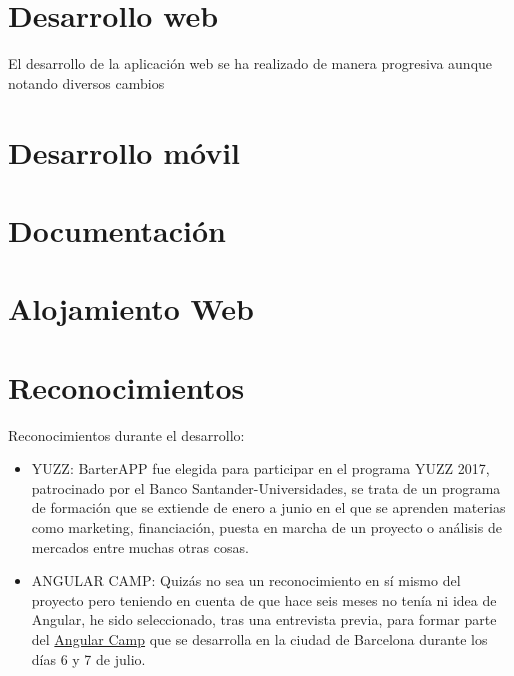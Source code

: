    
   \section{Desarrollo web}\label{dweb}
   
   El desarrollo de la aplicación web se ha realizado de manera progresiva aunque notando diversos cambios 
   
   \section{Desarrollo móvil}\label{dapp}
   
   \section{Documentación}\label{docs}
   
   \section{Alojamiento Web}\label{alojamiento}
   
   \section{Reconocimientos}\label{reconocimientos}
   
   Reconocimientos durante el desarrollo:
   
   \begin{itemize}
	\item YUZZ: BarterAPP fue elegida para participar en el programa YUZZ 2017, patrocinado por el Banco Santander-Universidades, se trata de un programa de formación que se extiende de enero a junio en el que se aprenden materias como marketing, financiación, puesta en marcha de un proyecto o análisis de mercados entre muchas otras cosas. 
	\item ANGULAR CAMP: Quizás no sea un reconocimiento en sí mismo del proyecto pero teniendo en cuenta de que hace seis meses no tenía ni idea de Angular, he sido seleccionado, tras una entrevista previa, para formar parte del  \hyperlink{https://angularcamp.org/}{Angular Camp} que se desarrolla en la ciudad de Barcelona durante los días 6 y 7 de julio.
\end{itemize}


 
 